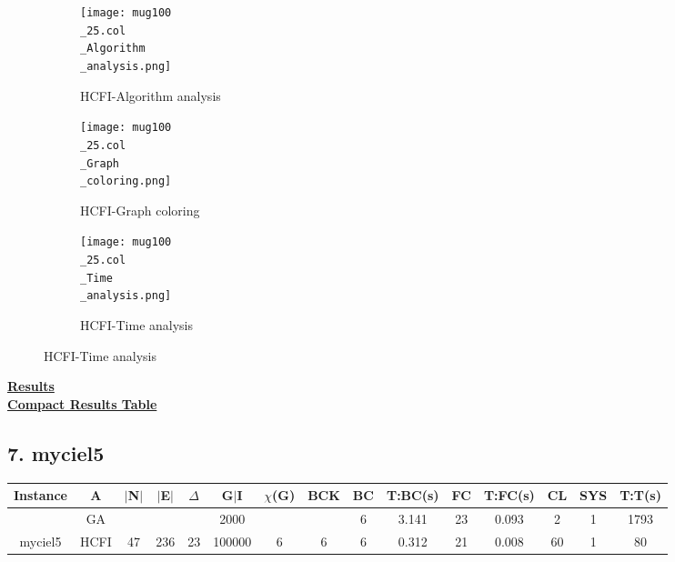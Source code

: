 \documentclass[10pt]{article}
\begin{document}
\graphicspath{{./Core1/Solutions/HCFI/mug100\_25.col}}
\begin{figure}[H]
\begin{subfigure}{.33\textwidth}
  \centering
  \texttt{[image: mug100\\\_25.col\\\_Algorithm\\\_analysis.png]}
  \caption{HCFI-Algorithm analysis}
   \label{fig:subfig1}
\end{subfigure}%
\begin{subfigure}{.33\textwidth}
  \centering
  \texttt{[image: mug100\\\_25.col\\\_Graph\\\_coloring.png]}
  \caption{HCFI-Graph coloring}
  \label{fig:subfig2}
\end{subfigure}
\begin{subfigure}{.33\textwidth}
  \centering
  \texttt{[image: mug100\\\_25.col\\\_Time\\\_analysis.png]}
  \caption{HCFI-Time analysis}
  \end{subfigure}
\end{figure}
\vspace{2cm}
\begin{center}
\hyperlink{page.8}{\textbf{Results}}\\
\vspace{0.5cm}
\hyperlink{page.71}{\textbf{Compact Results Table}}
\end{center}
\pagebreak
\subsection*{\hspace{0,9073976cm} 7. myciel5}
\begin{table}[H]
\centering
\begin{tabular}{|c|c|c|c|c|c|c|c|c|c|c|c|c|c|c|}
\hline
Instance& A &$|$N$|$ & $|$E$|$ & $\Delta$ & G$|$I & $\chi$(G) &BCK&BC & T:BC(s) & FC & T:FC(s) & CL & SYS & T:T(s) \\ \hline \hline
&GA&       &                   &                     & 2000        &     \cellcolor{yellow} & {\cellcolor{yellow}}& {{\cellcolor{green}6}}
&3.141   &23        &0.093                   &2                    &1          &1793        \\ \cline{2-2} \cline{6-6} \cline{9-15}
 \multirow{-2}{*}{myciel5} &HCFI   &\multirow{-2}{*}{47}   &\multirow{-2}{*}{236}     &\multirow{-2}{*}{23}     &100000     &\multirow{-2}{*}{\cellcolor{yellow}6}      & \multirow{-2}{*}{\cellcolor{yellow}6}    &{\cellcolor{green}6}     &0.312         &21     &0.008         &60    &1     &80        \\ \hline
\end{tabular}
\end{table}
\end{document}
